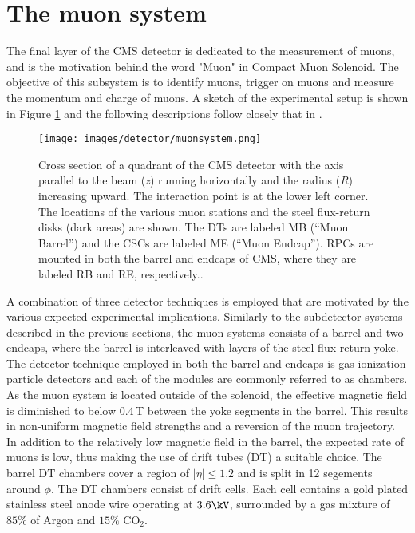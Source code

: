 \section{The muon system}\label{sec:muonsystem}
\noindent\justify
The final layer of the CMS detector is dedicated to the measurement of muons, and is the motivation behind the word "Muon" in Compact Muon Solenoid. 
The objective of this subsystem is to identify muons, trigger on muons and measure the momentum and charge of muons. 
A sketch of the experimental setup is shown in Figure \ref{fig:Muon} and the following descriptions follow closely that in \cite{Chatrchyan:2012xi}. 
\begin{figure}[!htp]
  \centering
   \texttt{[image: images/detector/muonsystem.png]}
   \caption{Cross section of a quadrant of the CMS detector with the axis parallel to the beam (\textit{z}) running horizontally and the radius (\textit{R}) increasing upward. The interaction point is at the lower left corner. The locations of the various muon stations and the steel flux-return disks (dark areas) are shown. The DTs are labeled MB (``Muon Barrel'') and the CSCs are labeled ME (``Muon Endcap''). RPCs are mounted in both the barrel and endcaps of CMS, where they are labeled RB and RE, respectively.\cite{Chatrchyan:2012xi}.}
   \label{fig:Muon}
\end{figure}                                                                                            
A combination of three detector techniques is employed that are motivated by the various expected experimental implications. 
Similarly to the subdetector systems described in the previous sections, the muon systems consists of a barrel and two endcaps, where the barrel is interleaved with layers of the steel flux-return yoke. 
\newpara
\noindent\justify
The detector technique employed in both the barrel and endcaps is gas ionization particle detectors and each of the modules are commonly referred to as chambers. 
As the muon system is located outside of the solenoid, the effective magnetic field is diminished to below 0.4$\,$T between the yoke segments in the barrel. 
This results in non-uniform magnetic field strengths and a reversion of the muon trajectory. 
In addition to the relatively low magnetic field in the barrel, the expected rate of muons is low, thus making the use of drift tubes (DT) a suitable choice. 
The barrel DT chambers cover a region of $|\eta|\leq1.2$ and is split in 12 segements around $\phi$. 
The DT chambers consist of drift cells. 
Each cell contains a gold plated stainless steel anode wire operating at $3.6\kV$, surrounded by a gas mixture of $85\%$ of Argon and $15\%$ $\mathrm{CO_{2}}$. 
